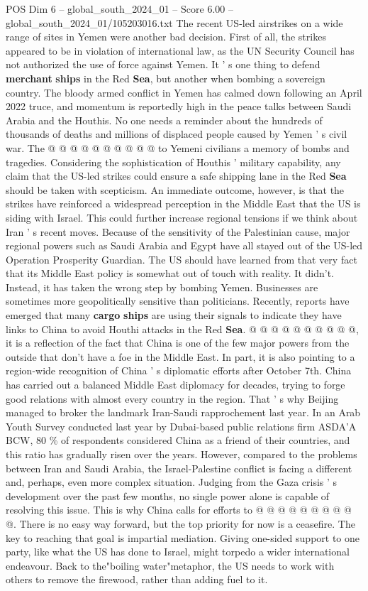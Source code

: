 \begin{textsample}{POS Dim 6 – global\_south\_2024\_01 – Score 6.00 – global\_south\_2024\_01/105203016.txt}
The recent US-led airstrikes on a wide range of sites in Yemen were another bad decision.
First of all, the strikes appeared to be in violation of international law, as the UN Security Council has not authorized the use of force against Yemen.
It ' s one thing to defend \textbf{merchant} \textbf{ships} in the Red \textbf{Sea}, but another when bombing a sovereign country.
The bloody armed conflict in Yemen has calmed down following an April 2022 truce, and momentum is reportedly high in the peace talks between Saudi Arabia and the Houthis.
No one needs a reminder about the hundreds of thousands of deaths and millions of displaced people caused by Yemen ' s civil war.
The @ @ @ @ @ @ @ @ @ @ to Yemeni civilians a memory of bombs and tragedies.
Considering the sophistication of Houthis ' military capability, any claim that the US-led strikes could ensure a safe shipping lane in the Red \textbf{Sea} should be taken with scepticism.
An immediate outcome, however, is that the strikes have reinforced a widespread perception in the Middle East that the US is siding with Israel.
This could further increase regional tensions if we think about Iran ' s recent moves.
Because of the sensitivity of the Palestinian cause, major regional powers such as Saudi Arabia and Egypt have all stayed out of the US-led Operation Prosperity Guardian.
The US should have learned from that very fact that its Middle East policy is somewhat out of touch with reality.
It didn't.
Instead, it has taken the wrong step by bombing Yemen.
Businesses are sometimes more geopolitically sensitive than politicians.
Recently, reports have emerged that many \textbf{cargo} \textbf{ships} are using their signals to indicate they have links to China to avoid Houthi attacks in the Red \textbf{Sea}. @ @ @ @ @ @ @ @ @ @, it is a reflection of the fact that China is one of the few major powers from the outside that don't have a foe in the Middle East.
In part, it is also pointing to a region-wide recognition of China ' s diplomatic efforts after October 7th.
China has carried out a balanced Middle East diplomacy for decades, trying to forge good relations with almost every country in the region.
That ' s why Beijing managed to broker the landmark Iran-Saudi rapprochement last year.
In an Arab Youth Survey conducted last year by Dubai-based public relations firm ASDA'A BCW, 80 \% of respondents considered China as a friend of their countries, and this ratio has gradually risen over the years.
However, compared to the problems between Iran and Saudi Arabia, the Israel-Palestine conflict is facing a different and, perhaps, even more complex situation.
Judging from the Gaza crisis ' s development over the past few months, no single power alone is capable of resolving this issue.
This is why China calls for efforts to @ @ @ @ @ @ @ @ @ @.
There is no easy way forward, but the top priority for now is a ceasefire.
The key to reaching that goal is impartial mediation.
Giving one-sided support to one party, like what the US has done to Israel, might torpedo a wider international endeavour.
Back to the"boiling water"metaphor, the US needs to work with others to remove the firewood, rather than adding fuel to it.


\end{textsample}
